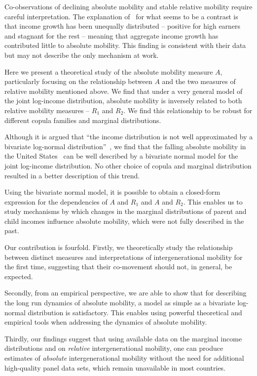 \documentclass[12pt]{article}
\numberwithin{equation}{section}
\begin{document}
Co-observations of declining absolute mobility and stable relative mobility require careful interpretation. The explanation of~\citet{chetty2017fading} for what seems to be a contrast is that income growth has been unequally distributed -- positive for high earners and stagnant for the rest -- meaning that aggregate income growth has contributed little to absolute mobility. This finding is consistent with their data but may not describe the only mechanism at work.

Here we present a theoretical study of the absolute mobility measure $A$, particularly focusing on the relationship between $A$ and the two measures of relative mobility mentioned above. We find that under a very general model of the joint log-income distribution, absolute mobility is inversely related to both relative mobility measures -- $R_1$ and $R_2$. We find this relationship to be robust for different copula families and marginal distributions.

Although it is argued that ``the income distribution is not well approximated by a bivariate log-normal distribution''~\citep[p.~1574]{chetty2014land}, we find that the falling absolute mobility in the United States~\citep{chetty2017fading} can be well described by a bivariate normal model for the joint log-income distribution. No other choice of copula and marginal distribution resulted in a better description of this trend.

Using the bivariate normal model, it is possible to obtain a closed-form expression for the dependencies of $A$ and $R_1$ and $A$ and $R_2$. This enables us to study mechanisms by which changes in the marginal distributions of parent and child incomes influence absolute mobility, which were not fully described in the past.

Our contribution is fourfold. Firstly, we theoretically study the relationship between distinct measures and interpretations of intergenerational mobility for the first time, suggesting that their co-movement should not, in general, be expected.

Secondly, from an empirical perspective, we are able to show that for describing the long run dynamics of absolute mobility, a model as simple as a bivariate log-normal distribution is satisfactory. This enables using powerful theoretical and empirical tools when addressing the dynamics of absolute mobility.

Thirdly, our findings suggest that using available data on the marginal income distributions and on \textit{relative} intergenerational mobility, one can produce estimates of \textit{absolute} intergenerational mobility without the need for additional high-quality panel data sets, which remain unavailable in most countries.
\end{document}
